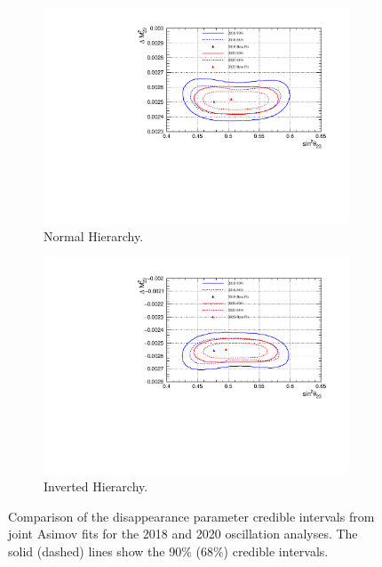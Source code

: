 \begin{figure}
\centering
\begin{subfigure}{.7\textwidth}
  \centering
  \includegraphics[width=0.95\linewidth]{figs/comparedmach3contours_2018vs2020Kevin/comparedmach3contours_RCeff_asimovA_NH}
  \caption{Normal Hierarchy.}
  \label{fig:20182020DisNH}
\end{subfigure}
\begin{subfigure}{.7\textwidth}
  \centering
  \includegraphics[width=0.95\linewidth]{figs/comparedmach3contours_2018vs2020Kevin/comparedmach3contours_RCeff_asimovA_IH}
  \caption{Inverted Hierarchy.}
  \label{fig:20182020DisIH}
\end{subfigure}
\caption{Comparison of the disappearance parameter credible intervals from joint Asimov fits for the 2018 and 2020 oscillation analyses. The solid (dashed) lines show the 90$\%$ ($68\%$) credible intervals.}
\label{fig:20182020Dis}
\end{figure}

